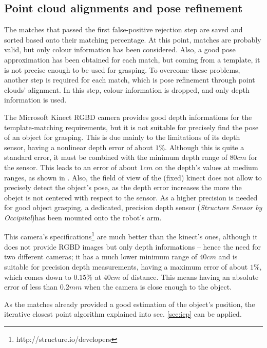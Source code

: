 \subsection{Point cloud alignments and pose refinement}
The matches that passed the first false-positive rejection step are saved and
sorted based onto their matching percentage. At this point, matches are probably
valid, but only colour information has been considered. Also, a good pose
approximation has been obtained for each match, but coming from a template, it
is not precise enough to be used for grasping. To overcome these problems,
another step is required for each match, which is pose refinement through point
clouds' alignment. In this step, colour information is dropped, and only depth
information is used. 

The Microsoft Kinect RGBD camera provides good depth informations for the template-matching
requirements, but it is not suitable for precisely find the pose of an object
for grasping. This is due mainly to the limitations of its depth sensor, having
a nonlinear depth error of about $1\%$.
Although this is quite a standard error, it must be combined with the minimum
depth range of $80\unit{cm}$ for the sensor. This leads to an error of about
$1\unit{cm}$ on the depth's values at medium ranges, as shown in \cite{kinect-evaluation}. Also, the field of view of the (fixed)
kinect does not allow to precisely detect the object's pose, as the depth error
increases the more the obejct is not centered with respect to the sensor. As a
higher precision is needed for good 
object grasping, a dedicated, precision depth sensor (\emph{Structure Sensor by
Occipital})has been mounted onto the robot's arm.


This camera's specifications\footnote{http://structure.io/developers} are much better than the kinect's ones, although it
does not provide RGBD images but only depth informations -- hence the need for two
different cameras; it has a much lower minimum range of $40\unit{cm}$ and is suitable for
precision depth measurements, having a maximum error of about $1\%$, which comes
down to $0.15\%$ at $40\unit{cm}$ of distance. This means having an absolute
error of less than $0.2\unit{mm}$ when the camera is close enough to the object.

As the matches already provided a good estimation of the object's position, the
iterative closest point algorithm explained into sec. \ref{sec:icp} can be
applied. 

